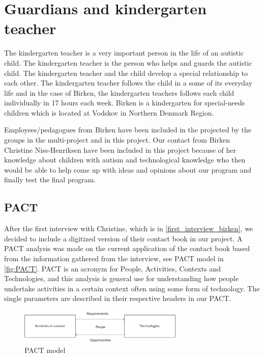 \section{Guardians and kindergarten teacher}
The kindergarten teacher is a very important person in the life of an autistic child. The kindergarten teacher is the person who helps and guards the autistic child. The kindergarten teacher and the child develop a special relationship to each other. The kindergarten teacher follows the child in a some of its everyday life and in the case of Birken, the kindergarten teachers follows each child individually in 17 hours each week. Birken is a kindergarten for special-needs children which is located at Vodskov in Northern Denmark Region.

Employees/pedagogues from Birken have been included in the projected by the groups in the multi-project and in this project. Our contact from Birken Christine Niss-Henriksen have been included in this project because of her knowledge about children with autism and technological knowledge who then would be able to help come up with ideas and opinions about our program and finally test the final program.  

\subsection{PACT}
After the first interview with Christine, which is in \vref{first_interview_birken}, we decided to include a digitized version of their contact book in our project. A PACT analysis was made on the current application of the contact book based from the information gathered from the interview, see PACT model in \vref{fig:PACT}. PACT is an acronym for People, Activities, Contexts and Technologies, and this analysis is general use for understanding how people undertake activities in a certain context often using some form of technology. The single parameters are described in their respective headers in our PACT. 

\begin{figure}
	\centering
		\includegraphics[width=0.70\textwidth]{img/PACT.png}
	\caption{PACT model}
	\label{fig:PACT}
\end{figure}



